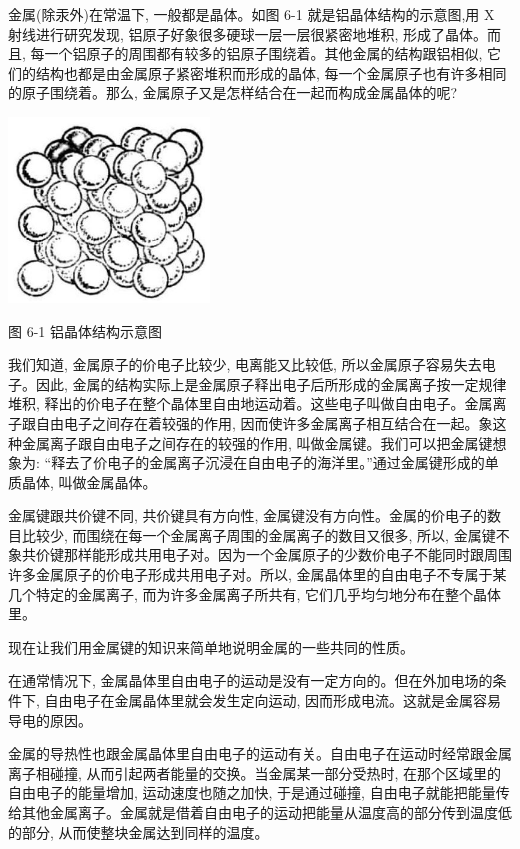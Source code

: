 \documentclass[10pt]{article}
\begin{document}
金属(除汞外)在常温下, 一般都是晶体。如图 6-1 就是铝晶体结构的示意图,用 \(\mathrm{X}\) 射线进行研究发现, 铝原子好象很多硬球一层一层很紧密地堆积, 形成了晶体。而且, 每一个铝原子的周围都有较多的铝原子围绕着。其他金属的结构跟铝相似, 它们的结构也都是由金属原子紧密堆积而形成的晶体, 每一个金属原子也有许多相同的原子围绕着。那么, 金属原子又是怎样结合在一起而构成金属晶体的呢?

\begin{center}
\includegraphics[max width=0.4\textwidth]{images/01912d13-9986-7822-a012-3f3f7be99dcb_182_564377.jpg}
\end{center}

图 6-1 铝晶体结构示意图

我们知道, 金属原子的价电子比较少, 电离能又比较低, 所以金属原子容易失去电子。因此, 金属的结构实际上是金属原子释出电子后所形成的金属离子按一定规律堆积, 释出的价电子在整个晶体里自由地运动着。这些电子叫做自由电子。金属离子跟自由电子之间存在着较强的作用, 因而使许多金属离子相互结合在一起。象这种金属离子跟自由电子之间存在的较强的作用, 叫做金属键。我们可以把金属键想象为: “释去了价电子的金属离子沉浸在自由电子的海洋里。”通过金属键形成的单质晶体, 叫做金属晶体。

金属键跟共价键不同, 共价键具有方向性, 金属键没有方向性。金属的价电子的数目比较少, 而围绕在每一个金属离子周围的金属离子的数目又很多, 所以, 金属键不象共价键那样能形成共用电子对。因为一个金属原子的少数价电子不能同时跟周围许多金属原子的价电子形成共用电子对。所以, 金属晶体里的自由电子不专属于某几个特定的金属离子, 而为许多金属离子所共有, 它们几乎均匀地分布在整个晶体里。

现在让我们用金属键的知识来简单地说明金属的一些共同的性质。

在通常情况下, 金属晶体里自由电子的运动是没有一定方向的。但在外加电场的条件下, 自由电子在金属晶体里就会发生定向运动, 因而形成电流。这就是金属容易导电的原因。

金属的导热性也跟金属晶体里自由电子的运动有关。自由电子在运动时经常跟金属离子相碰撞, 从而引起两者能量的交换。当金属某一部分受热时, 在那个区域里的自由电子的能量增加, 运动速度也随之加快, 于是通过碰撞, 自由电子就能把能量传给其他金属离子。金属就是借着自由电子的运动把能量从温度高的部分传到温度低的部分, 从而使整块金属达到同样的温度。
\end{document}
